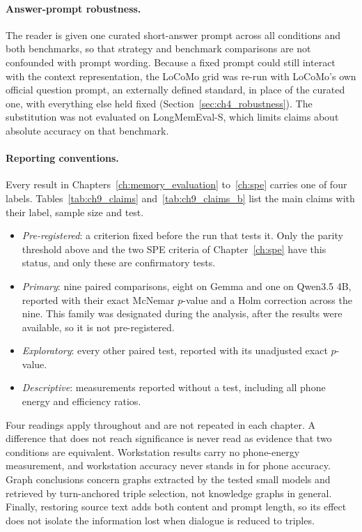 \paragraph{Answer-prompt robustness.} The reader is given one curated short-answer prompt across all
conditions and both benchmarks, so that strategy and benchmark comparisons are not confounded with
prompt wording. Because a fixed prompt could still interact with the context representation, the
LoCoMo grid was re-run with LoCoMo's own official question prompt, an externally defined standard, in
place of the curated one, with everything else held fixed (Section~\ref{sec:ch4_robustness}). The
substitution was not evaluated on LongMemEval-S, which limits claims about absolute accuracy on that
benchmark.

\paragraph{Reporting conventions.} Every result in Chapters~\ref{ch:memory_evaluation}
to~\ref{ch:spe} carries one of four labels. Tables~\ref{tab:ch9_claims} and~\ref{tab:ch9_claims_b} list the main claims with
their label, sample size and test.
\begin{itemize}
  \item \emph{Pre-registered}: a criterion fixed before the run that tests it. Only the parity
        threshold above and the two SPE criteria of Chapter~\ref{ch:spe} have this status, and
        only these are confirmatory tests.
  \item \emph{Primary}: nine paired comparisons, eight on Gemma and one on Qwen3.5 4B, reported with
        their exact McNemar $p$-value and a Holm correction across the nine. This family was
        designated during the analysis, after the results were available, so it is not
        pre-registered.
  \item \emph{Exploratory}: every other paired test, reported with its unadjusted exact $p$-value.
  \item \emph{Descriptive}: measurements reported without a test, including all phone energy
        and efficiency ratios.
\end{itemize}
Four readings apply throughout and are not repeated in each chapter. A difference that does not
reach significance is never read as evidence that two conditions are equivalent. Workstation
results carry no phone-energy measurement, and workstation accuracy never stands in for phone
accuracy. Graph conclusions concern graphs extracted by the tested small models and retrieved by
turn-anchored triple selection, not knowledge graphs in general. Finally, restoring source text
adds both content and prompt length, so its effect does not isolate the information lost when
dialogue is reduced to triples.

